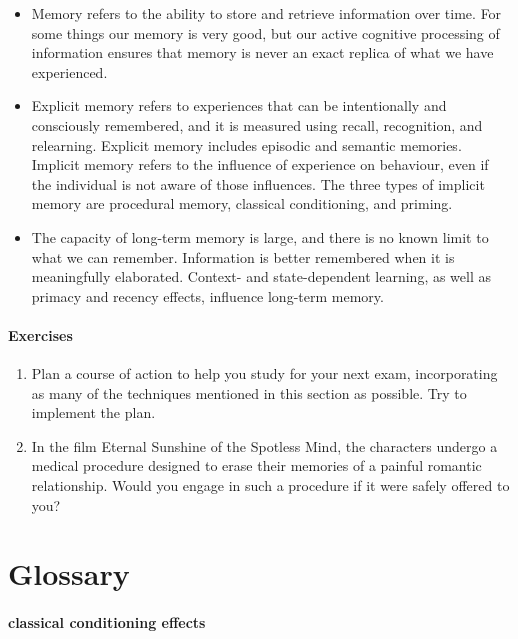 \documentclass[
]{krantz}
\providecommand{\tightlist}{%
  \setlength{\itemsep}{0pt}\setlength{\parskip}{0pt}}
\begin{document}
\begin{itemize}
\tightlist
\item
  Memory refers to the ability to store and retrieve information over time. For some things our memory is very good, but our active cognitive processing of information ensures that memory is never an exact replica of what we have experienced.
\item
  Explicit memory refers to experiences that can be intentionally and consciously remembered, and it is measured using recall, recognition, and relearning. Explicit memory includes episodic and semantic memories. Implicit memory refers to the influence of experience on behaviour, even if the individual is not aware of those influences. The three types of implicit memory are procedural memory, classical conditioning, and priming.
\item
  The capacity of long-term memory is large, and there is no known limit to what we can remember. Information is better remembered when it is meaningfully elaborated. Context- and state-dependent learning, as well as primacy and recency effects, influence long-term memory.
\end{itemize}

\hypertarget{exercises-4}{%
\paragraph*{Exercises}\label{exercises-4}}

\begin{enumerate}
\def\labelenumi{\arabic{enumi}.}
\tightlist
\item
  Plan a course of action to help you study for your next exam, incorporating as many of the techniques mentioned in this section as possible. Try to implement the plan.
\item
  In the film Eternal Sunshine of the Spotless Mind, the characters undergo a medical procedure designed to erase their memories of a painful romantic relationship. Would you engage in such a procedure if it were safely offered to you?
\end{enumerate}

\hypertarget{glossary-4}{%
\section{Glossary}\label{glossary-4}}

\hypertarget{classical-conditioning-effects}{%
\paragraph*{classical conditioning effects}\label{classical-conditioning-effects}}
\end{document}
